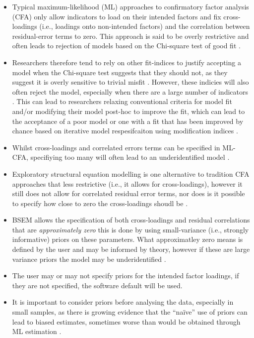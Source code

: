 \documentclass[]{book}
\providecommand{\tightlist}{%
  \setlength{\itemsep}{0pt}\setlength{\parskip}{0pt}}
\begin{document}
\begin{itemize}
\tightlist
\item
  Typical maximum-likelihood (ML) approaches to confirmatory factor analysis (CFA) only allow indicators to load on their intended factors and fix cross-loadings (i.e., loadings onto non-intended factors) and the correlation between residual-error terms to zero. This approach is said to be overly restrictive and often leads to rejection of models based on the Chi-square test of good fit \citep{Marsh2009}.
\item
  Researchers therefore tend to rely on other fit-indices to justify accepting a model when the Chi-square test suggests that they should not, as they suggest it is overly sensitive to trivial misfit \citep{Fong2013}. However, these indicies will also often reject the model, especially when there are a large number of indicators \citep{Marsh2004}. This can lead to researchers relaxing conventional criteria for model fit and/or modifying their model post-hoc to improve the fit, which can lead to the acceptance of a poor model or one with a fit that has been improved by chance based on iterative model respesifcaiton using modification indices \citep{MacCallum1992}.
\item
  Whilst cross-loadings and correlated errors terms can be specified in ML-CFA, specifiying too many will often lead to an underidentified model \citep{Asparouhov2009}.
\item
  Exploratory structural equation modelling is one alternative to tradition CFA approaches that less restrictive (i.e., it allows for cross-loadings), however it still does not allow for correlated residual error terms, nor does is it possible to specify how close to zero the cross-loadings shoudl be \citep{Muthen2012}.
\item
  BSEM allows the specification of both cross-loadings and residual correlations that are \emph{approximately zero} this is done by using small-variance (i.e., strongly informative) priors on these parameters. What approximatley zero means is defined by the user and may be informed by theory, however if these are large variance priors the model may be underidentified \citep{Muthen2012}.
\item
  The user may or may not specify priors for the intended factor loadings, if they are not specified, the software default will be used.
\item
  It is important to consider priors before analysing the data, especially in small samples, as there is growing evidence that the ``naïve'' use of priors can lead to biased estimates, sometimes worse than would be obtained through ML estimation \citep{Smid2019}.
\end{itemize}
\end{document}
